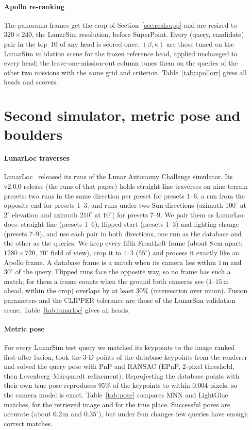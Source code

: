 \documentclass[letterpaper,journal]{IEEEtran}
\begin{document}
\paragraph*{Apollo re-ranking} The panorama frames get the crop of Section~\ref{sec:realsupp} and are resized to
$320\times240$, the LunarSim resolution, before SuperPoint. Every (query, candidate) pair in the top~10 of
any head is scored once. $(\beta,\kappa)$ are those tuned on the LunarSim validation scene for the frozen
reference head, applied unchanged to every head; the leave-one-mission-out column tunes them on the
queries of the other two missions with the same grid and criterion. Table~\ref{tab:apollorr} gives all heads and
scorers.


\section{Second simulator, metric pose and boulders}\label{sec:extsupp}
\paragraph*{LunarLoc traverses} LunarLoc~\cite{thomas2026lunarloc} released its runs of the Lunar Autonomy
Challenge simulator. Its v2.0.0 release (the runs of that paper) holds straight-line traverses on nine terrain presets:
two runs in the same direction per preset for presets 1--6, a run from the opposite end for presets 1--3, and
runs under two Sun directions (azimuth $100^\circ$ at $2^\circ$ elevation and azimuth $210^\circ$ at $10^\circ$) for
presets 7--9. We pair them as LunarLoc does: straight line (presets 1--6), flipped start (presets 1--3) and
lighting change (presets 7--9), and use each pair in both directions, one run as the database and the other as
the queries. We keep every fifth FrontLeft frame (about $8$\,cm apart; $1280\times720$, $70^\circ$ field of
view), crop it to $4{:}3$ ($55^\circ$) and process it exactly like an Apollo frame. A database frame is a match
when its camera lies within $1$\,m and $30^\circ$ of the query. Flipped runs face the opposite way, so no frame
has such a match; for them a frame counts when the ground both cameras see ($1$--$15$\,m ahead, within the crop)
overlaps by at least $30\%$ (intersection over union). Fusion parameters and the CLIPPER tolerance are those of
the LunarSim validation scene. Table~\ref{tab:lunarloc} gives all heads.

\paragraph*{Metric pose} For every LunarSim test query we matched its keypoints to the image ranked first after
fusion, took the 3-D points of the database keypoints from the renderer and solved the query pose with PnP and
RANSAC (EPnP, $2$-pixel threshold, then Levenberg--Marquardt refinement). Reprojecting the database points with
their own true pose reproduces $95\%$ of the keypoints to within $0.004$ pixels, so the camera model is exact.
Table~\ref{tab:pose} compares MNN and LightGlue matches, for the retrieved image and for the true place. Successful
poses are accurate (about $0.2$\,m and $0.35^\circ$), but under Sun changes few queries have enough correct matches.
\end{document}
